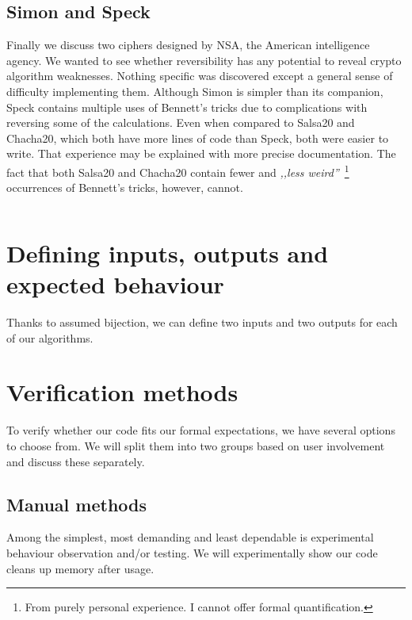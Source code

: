 \documentclass[a4paper,10pt,openright]{memoir}
\begin{document}
\subsection{Simon and Speck}

Finally we discuss two ciphers designed by NSA, the American 
intelligence agency. We wanted to see whether reversibility has any 
potential to reveal crypto algorithm weaknesses. Nothing specific was 
discovered except a general sense of difficulty implementing them. 
Although Simon is simpler than its companion, Speck contains multiple 
uses of Bennett's tricks due to complications with reversing some of 
the calculations. Even when compared to Salsa20 and Chacha20, which 
both have more lines of code than Speck, both were easier to write. 
That experience may be explained with more precise documentation. The 
fact that both Salsa20 and Chacha20 contain fewer and \textit{,,less 
weird''}~\footnote{From purely personal experience. I cannot offer 
formal quantification.} occurrences of Bennett's tricks, however, 
cannot.

\begin{lstlisting}
\end{lstlisting}


\section{Defining inputs, outputs and expected behaviour}

Thanks to assumed bijection, we can define two inputs and two outputs for each of our algorithms. 

\section{Verification methods}

To verify whether our code fits our formal expectations, we have 
several options to choose from. We will split them into two groups 
based on user involvement and discuss these separately.

\subsection{Manual methods}

Among the simplest, most demanding and least dependable is experimental 
behaviour observation and/or testing. We will experimentally show our 
code cleans up memory after usage.
\end{document}

